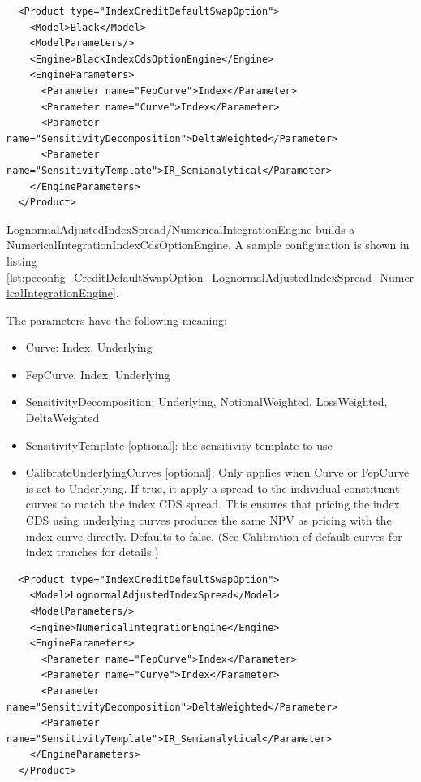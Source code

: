 \begin{longlisting}
\begin{verbatim}
  <Product type="IndexCreditDefaultSwapOption">
    <Model>Black</Model>
    <ModelParameters/>
    <Engine>BlackIndexCdsOptionEngine</Engine>
    <EngineParameters>
      <Parameter name="FepCurve">Index</Parameter>
      <Parameter name="Curve">Index</Parameter>
      <Parameter name="SensitivityDecomposition">DeltaWeighted</Parameter>
      <Parameter name="SensitivityTemplate">IR_Semianalytical</Parameter>
    </EngineParameters>
  </Product>
\end{verbatim}
\caption{Configuration for Product IndexCreditDefaultSwapOption, Model Black, Engine BlackIndexCdsOptionEngine}
\label{lst:peconfig_CreditDefaultSwapOption_Black_BlackIndexCdsOptionEngine}
\end{longlisting}

LognormalAdjustedIndexSpread/NumericalIntegrationEngine builds a NumericalIntegrationIndexCdsOptionEngine. A sample
configuration is shown in listing
\ref{lst:peconfig_CreditDefaultSwapOption_LognormalAdjustedIndexSpread_NumericalIntegrationEngine}.

The parameters have the following meaning:

\begin{itemize}
\item Curve: Index, Underlying
\item FepCurve: Index, Underlying
\item SensitivityDecomposition: Underlying, NotionalWeighted, LossWeighted, DeltaWeighted
\item SensitivityTemplate [optional]: the sensitivity template to use
\item CalibrateUnderlyingCurves [optional]: Only applies when Curve or FepCurve is set to Underlying.
If true, it apply a spread to the individual constituent curves to match the index CDS spread.
This ensures that pricing the index CDS using underlying curves produces the same NPV as pricing with the index curve directly. Defaults to false.
(See Calibration of default curves for index tranches for details.)
\end{itemize}

\begin{longlisting}
\begin{verbatim}
  <Product type="IndexCreditDefaultSwapOption">
    <Model>LognormalAdjustedIndexSpread</Model>
    <ModelParameters/>
    <Engine>NumericalIntegrationEngine</Engine>
    <EngineParameters>
      <Parameter name="FepCurve">Index</Parameter>
      <Parameter name="Curve">Index</Parameter>
      <Parameter name="SensitivityDecomposition">DeltaWeighted</Parameter>
      <Parameter name="SensitivityTemplate">IR_Semianalytical</Parameter>
    </EngineParameters>
  </Product>
\end{verbatim}
\caption{Configuration for Product IndexCreditDefaultSwapOption, Model LognormalAdjustedIndexSpread, Engine NumericalIntegrationEngine}
\label{lst:peconfig_CreditDefaultSwapOption_LognormalAdjustedIndexSpread_NumericalIntegrationEngine}
\end{longlisting}

